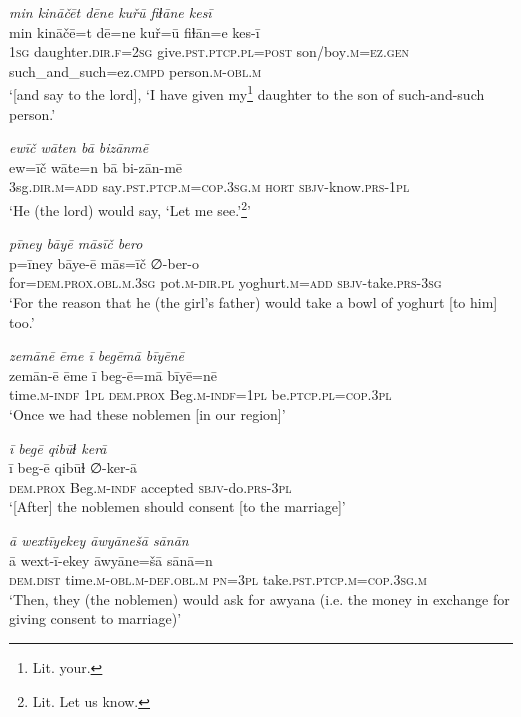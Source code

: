 \ea \label{RE.49}
\textit{min kināčēt dēne kuřū fiɫāne kesī} \\ 
\gll min kināčē=t dē=ne kuř=ū fiɫān=e kes-ī \\ 
 \textsc{1sg} daughter\textsc{.dir}\textsc{.f}\textsc{=\textsc{2sg}} give\textsc{.pst}\textsc{.ptcp}\textsc{.pl}\textsc{=\textsc{post}} son/boy\textsc{.m}\textsc{=ez.gen} such\_and\_such=ez\textsc{.cmpd} person\textsc{.m}\textsc{-obl}\textsc{.m} \\ 
\glt `[and say to the lord], ‘I have given my\footnote{Lit. your.} daughter to the son of such-and-such person.'
\z 
 
\ea \label{RE.51}
\textit{ewīč wāten bā bizānmē} \\ 
\gll ew=īč wāte=n bā bi-zān-mē \\ 
 3sg\textsc{.dir}\textsc{.m}\textsc{=add} say\textsc{.pst}\textsc{.ptcp}\textsc{.m}\textsc{=cop}\textsc{.3sg}\textsc{.m} \textsc{hort} \textsc{sbjv-}know\textsc{.prs}\textsc{-\textsc{1pl}} \\ 
\glt `He (the lord) would say, ‘Let me see.’\footnote{Lit. Let us know.}'
\z 
 
\ea \label{RE.52}
\textit{pīney bāyē māsīč bero} \\ 
\gll p=īney bāye-ē mās=īč ∅-ber-o \\ 
 for=\textsc{dem.prox}\textsc{.obl}\textsc{.m}\textsc{.3sg} pot\textsc{.m}\textsc{-dir}\textsc{.pl} yoghurt\textsc{.m}\textsc{=add} \textsc{sbjv-}take\textsc{.prs}\textsc{-3sg} \\ 
\glt `For the reason that he (the girl’s father) would take a bowl of yoghurt [to him] too.'
\z 
 
\ea \label{RE.56}
\textit{zemānē ēme ī begēmā bīyēnē} \\ 
\gll zemān-ē ēme ī beg-ē=mā bīyē=nē \\ 
 time\textsc{.m}\textsc{-indf} \textsc{1pl} \textsc{dem.prox} Beg\textsc{.m}\textsc{-indf}\textsc{=\textsc{1pl}} be\textsc{.ptcp}\textsc{.pl}\textsc{=cop}\textsc{.3pl} \\ 
\glt `Once we had these noblemen [in our region]'
\z 
 
\ea \label{RE.57}
\textit{ī begē qibūɫ kerā} \\ 
\gll ī beg-ē qibūɫ ∅-ker-ā \\ 
 \textsc{dem.prox} Beg\textsc{.m}\textsc{-indf} accepted \textsc{sbjv-}do\textsc{.prs}\textsc{-3pl} \\ 
\glt `[After] the noblemen should consent [to the marriage]'
\z 
 
\ea \label{RE.58}
\textit{ā wextīyekey āwyānešā sānān} \\ 
\gll ā wext-ī-ekey āwyāne=šā sānā=n \\ 
 \textsc{dem.dist} time\textsc{.m}\textsc{-obl}\textsc{.m}\textsc{-def}\textsc{.obl}\textsc{.m} \textsc{pn}\textsc{=3pl} take\textsc{.pst}\textsc{.ptcp}\textsc{.m}\textsc{=cop}\textsc{.3sg}\textsc{.m} \\ 
\glt `Then, they (the noblemen) would ask for awyana (i.e. the money in exchange for giving consent to marriage)'
\z 
 
